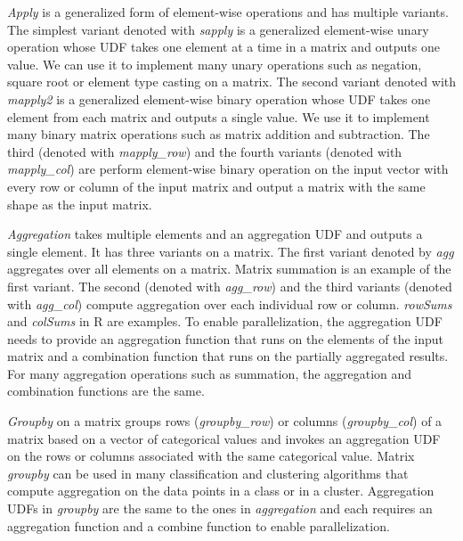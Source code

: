 \textit{Apply} is a generalized form of element-wise operations and has
multiple variants. The simplest variant denoted with \textit{sapply} is
a generalized element-wise unary operation whose UDF takes one element at a time
in a matrix and outputs one value. We can use it to implement many unary
operations such as negation, square root or element type casting
on a matrix. The second variant denoted with \textit{mapply2} is a generalized
element-wise binary operation whose UDF takes one element from each
matrix and outputs a single value. We use it to implement many binary
matrix operations such as matrix addition and subtraction. The third
(denoted with \textit{mapply\_row}) and the fourth variants (denoted with
\textit{mapply\_col}) are perform element-wise
binary operation on the input vector with every row or column of the input
matrix and output a matrix with the same shape as the input matrix.

\textit{Aggregation} takes multiple elements and an aggregation UDF and outputs
a single element. It has three variants on a matrix.
The first variant denoted by \textit{agg} aggregates over all elements on a matrix.
Matrix summation is an example of the first variant. The second (denoted with
\textit{agg\_row}) and the third variants (denoted with \textit{agg\_col})
compute aggregation over each individual row or column. \textit{rowSums}
and \textit{colSums} in R are examples.
To enable parallelization, the aggregation UDF needs to
provide an aggregation function that runs on the elements of the input matrix
and a combination function that runs on the partially aggregated
results. For many aggregation operations such as summation, the aggregation
and combination functions are the same.

\textit{Groupby} on a matrix groups rows (\textit{groupby\_row}) or columns
(\textit{groupby\_col}) of a matrix based on a vector of categorical values
and invokes an aggregation UDF on the rows or
columns associated with the same categorical value. Matrix \textit{groupby}
can be used in many classification and clustering algorithms that compute
aggregation on the data points in a class or in a cluster. Aggregation UDFs
in \textit{groupby} are the same
to the ones in \textit{aggregation} and each requires an aggregation function
and a combine function to enable parallelization.

